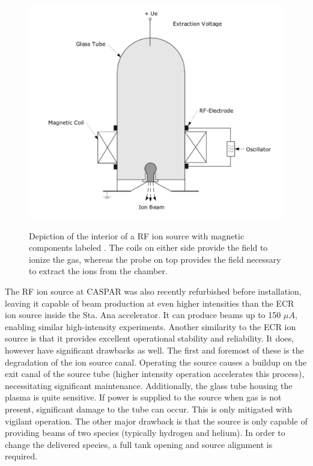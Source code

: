 \begin{figure}
\includegraphics[width=\linewidth]{figures/rfSchematic.png}
\label{fig: rfis}
\caption{Depiction of the interior of a RF ion source with magnetic components labeled \cite{Li2015}. The coils on either side provide the field to ionize the gas, whereas the probe on top provides the field necessary to extract the ions from the chamber.}
\end{figure}

The RF ion source at CASPAR was also recently refurbished before installation, leaving it capable of beam production at even higher intensities than the ECR ion source inside the Sta. Ana accelerator. It can produce beams up to 150 $\mu A$, enabling similar high-intensity experiments. Another similarity to the ECR ion source is that it provides excellent operational stability and reliability. It does, however have significant drawbacks as well. The first and foremost of these is the degradation of the ion source canal. Operating the source causes a buildup on the exit canal of the source tube (higher intensity operation accelerates this process), necessitating significant maintenance. Additionally, the glass tube housing the plasma is quite sensitive. If power is supplied to the source when gas is not present, significant damage to the tube can occur. This is only mitigated with vigilant operation. The other major drawback is that the source is only capable of providing beams of two species (typically hydrogen and helium). In order to change the delivered species, a full tank opening and source alignment is required. 

